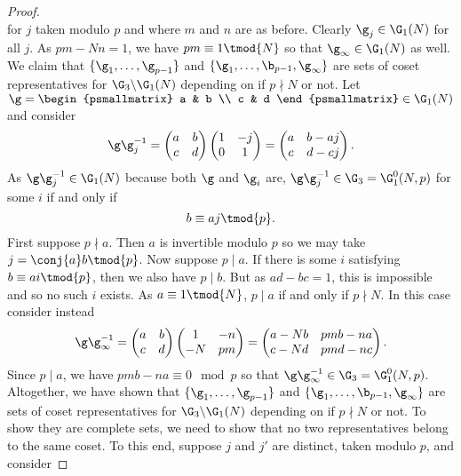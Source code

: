 \begin{proof}
\[      \]
      for $j$ taken modulo $p$ and where $m$ and $n$ are as before. Clearly $\g_{j} \in \G_{1}(N)$ for all $j$. As $pm-Nn = 1$, we have $pm \equiv 1 \tmod{N}$ so that $\g_{\infty} \in \G_{1}(N)$ as well. We claim that $\{\g_{1},\ldots,\g_{p-1}\}$ and $\{\g_{1},\ldots,\b_{p-1},\g_{\infty}\}$ are sets of coset representatives for $\G_{3}\backslash\G_{1}(N)$ depending on if $p \nmid N$ or not. Let $\g = \begin{psmallmatrix} a & b \\ c & d \end{psmallmatrix} \in \G_{1}(N)$ and consider
      \[
        \g\g_{j}^{-1} = \begin{pmatrix} a & b \\ c & d \end{pmatrix}\begin{pmatrix} 1 & -j \\ 0 & 1 \end{pmatrix} = \begin{pmatrix} a & b-aj \\ c & d-cj \end{pmatrix}.
      \]
      As $\g\g_{j}^{-1} \in \G_{1}(N)$ because both $\g$ and $\g_{i}$ are, $\g\g_{j}^{-1} \in \G_{3} = \G_{1}^{0}(N,p)$ for some $i$ if and only if
      \[
        b \equiv aj \tmod{p}.
      \]
      First suppose $p \nmid a$. Then $a$ is invertible modulo $p$ so we may take $j = \conj{a}b \tmod{p}$. Now suppose $p \mid a$. If there is some $i$ satisfying $b \equiv ai \tmod{p}$, then we also have $p \mid b$. But as $ad-bc = 1$, this is impossible and so no such $i$ exists. As $a \equiv 1 \tmod{N}$, $p \mid a$ if and only if $p \nmid N$. In this case consider instead
      \[
        \g\g_{\infty}^{-1} = \begin{pmatrix} a & b \\ c & d \end{pmatrix}\begin{pmatrix} 1 & -n \\ -N & pm \end{pmatrix} = \begin{pmatrix} a-Nb & pmb-na \\ c-Nd & pmd-nc \end{pmatrix}.
      \]
      Since $p \mid a$, we have $pmb-na \equiv 0 \mod{p}$ so that $\g\g_{\infty}^{-1} \in \G_{3} = \G_{1}^{0}(N,p)$. Altogether, we have shown that $\{\g_{1},\ldots,\g_{p-1}\}$ and $\{\g_{1},\ldots,\b_{p-1},\g_{\infty}\}$ are sets of coset representatives for $\G_{3}\backslash\G_{1}(N)$ depending on if $p \nmid N$ or not. To show they are complete sets, we need to show that no two representatives belong to the same coset. To this end, suppose $j$ and $j'$ are distinct, taken modulo $p$, and consider

\end{proof}

